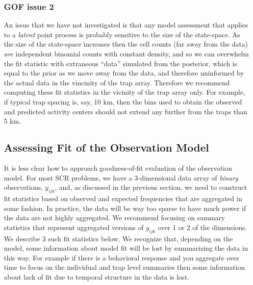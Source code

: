 \subsubsection{GOF issue 2}

An issue that we have not investigated is that any model assessment
that applies to a {\it latent} point process is probably sensitive to
the size of the state-space. As the size of the state-space increases
then the cell counts (far away from the data) {\it are} independent
binomial counts with constant density, and so we can overwhelm the fit
statistic with extraneous ``data'' simulated from the posterior, which
is equal to the prior as we move away from the data, and therefore
uninformed by the actual data in the vincinity of the trap array.
Therefore we recommend computing these fit statistics in the vicinity
of the trap array only. For example, if typical trap spacing is, say,
10 km, then the bins used to obtain the observed and predicted
activity centers should not extend any further from the traps than 5
km.

 





\subsection{Assessing  Fit of the Observation Model}

It is less clear how to approach goodness-of-fit evaluation of the
observation model. 
For most SCR problems, we have a 3-dimensional data array of {\it
  binary} observations, $y_{ijk}$, and, as discussed in the previous
section, we need to construct fit statistics based on observed and
expected frequencies that are aggregated in some fashion.  In
practice, the data will be way too sparse to have much power if the
data are not highly aggregated. We recommend focusing on summary
statistics that represent aggregated versions of $y_{ijk}$ over 1 or 2
of the dimensions. We describe 3 such fit statistics below.  We
recognize that, depending on the model, some information about model
fit will be lost by summarizing the data in this way. For example if
there is a behavioral response and you aggregate over time to focus on
the individual and trap level summaries then some information about
lack of fit due to temporal structure in the data is lost. 



